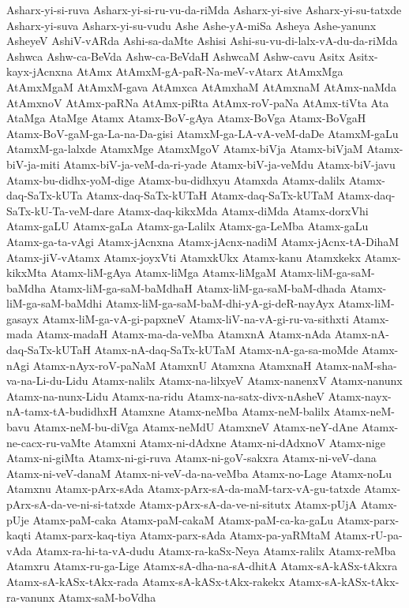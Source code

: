 {Asharx-yi-si-ruva
Asharx-yi-si-ru-vu-da-riMda
Asharx-yi-sive
Asharx-yi-su-tatxde
Asharx-yi-suva
Asharx-yi-su-vudu
Ashe
Ashe-yA-miSa
Asheya
Ashe-yanunx
AsheyeV
AshiV-vARda
Ashi-sa-daMte
Ashisi
Ashi-su-vu-di-lalx-vA-du-da-riMda
Ashwca
Ashw-ca-BeVda
Ashw-ca-BeVdaH
AshwcaM
Ashw-cavu
Asitx
Asitx-kayx-jAcnxna
AtAmx
AtAmxM-gA-paR-Na-meV-vAtarx
AtAmxMga
AtAmxMgaM
AtAmxM-gava
AtAmxca
AtAmxhaM
AtAmxnaM
AtAmx-naMda
AtAmxnoV
AtAmx-paRNa
AtAmx-piRta
AtAmx-roV-paNa
AtAmx-tiVta
Ata
AtaMga
AtaMge
Atamx
Atamx-BoV-gAya
Atamx-BoVga
Atamx-BoVgaH
Atamx-BoV-gaM-ga-La-na-Da-gisi
AtamxM-ga-LA-vA-veM-daDe
AtamxM-gaLu
AtamxM-ga-lalxde
AtamxMge
AtamxMgoV
Atamx-biVja
Atamx-biVjaM
Atamx-biV-ja-miti
Atamx-biV-ja-veM-da-ri-yade
Atamx-biV-ja-veMdu
Atamx-biV-javu
Atamx-bu-didhx-yoM-dige
Atamx-bu-didhxyu
Atamxda
Atamx-dalilx
Atamx-daq-SaTx-kUTa
Atamx-daq-SaTx-kUTaH
Atamx-daq-SaTx-kUTaM
Atamx-daq-SaTx-kU-Ta-veM-dare
Atamx-daq-kikxMda
Atamx-diMda
Atamx-dorxVhi
Atamx-gaLU
Atamx-gaLa
Atamx-ga-Lalilx
Atamx-ga-LeMba
Atamx-gaLu
Atamx-ga-ta-vAgi
Atamx-jAcnxna
Atamx-jAcnx-nadiM
Atamx-jAcnx-tA-DihaM
Atamx-jiV-vAtamx
Atamx-joyxVti
AtamxkUkx
Atamx-kanu
Atamxkekx
Atamx-kikxMta
Atamx-liM-gAya
Atamx-liMga
Atamx-liMgaM
Atamx-liM-ga-saM-baMdha
Atamx-liM-ga-saM-baMdhaH
Atamx-liM-ga-saM-baM-dhada
Atamx-liM-ga-saM-baMdhi
Atamx-liM-ga-saM-baM-dhi-yA-gi-deR-nayAyx
Atamx-liM-gasayx
Atamx-liM-ga-vA-gi-papxneV
Atamx-liV-na-vA-gi-ru-va-sithxti
Atamx-mada
Atamx-madaH
Atamx-ma-da-veMba
AtamxnA
Atamx-nAda
Atamx-nA-daq-SaTx-kUTaH
Atamx-nA-daq-SaTx-kUTaM
Atamx-nA-ga-sa-moMde
Atamx-nAgi
Atamx-nAyx-roV-paNaM
AtamxnU
Atamxna
AtamxnaH
Atamx-naM-sha-va-na-Li-du-Lidu
Atamx-nalilx
Atamx-na-lilxyeV
Atamx-nanenxV
Atamx-nanunx
Atamx-na-nunx-Lidu
Atamx-na-ridu
Atamx-na-satx-divx-nAsheV
Atamx-nayx-nA-tamx-tA-budidhxH
Atamxne
Atamx-neMba
Atamx-neM-balilx
Atamx-neM-bavu
Atamx-neM-bu-diVga
Atamx-neMdU
AtamxneV
Atamx-neY-dAne
Atamx-ne-cacx-ru-vaMte
Atamxni
Atamx-ni-dAdxne
Atamx-ni-dAdxnoV
Atamx-nige
Atamx-ni-giMta
Atamx-ni-gi-ruva
Atamx-ni-goV-sakxra
Atamx-ni-veV-dana
Atamx-ni-veV-danaM
Atamx-ni-veV-da-na-veMba
Atamx-no-Lage
Atamx-noLu
Atamxnu
Atamx-pArx-sAda
Atamx-pArx-sA-da-maM-tarx-vA-gu-tatxde
Atamx-pArx-sA-da-ve-ni-si-tatxde
Atamx-pArx-sA-da-ve-ni-situtx
Atamx-pUjA
Atamx-pUje
Atamx-paM-caka
Atamx-paM-cakaM
Atamx-paM-ca-ka-gaLu
Atamx-parx-kaqti
Atamx-parx-kaq-tiya
Atamx-parx-sAda
Atamx-pa-yaRMtaM
Atamx-rU-pa-vAda
Atamx-ra-hi-ta-vA-dudu
Atamx-ra-kaSx-Neya
Atamx-ralilx
Atamx-reMba
Atamxru
Atamx-ru-ga-Lige
Atamx-sA-dha-na-sA-dhitA
Atamx-sA-kASx-tAkxra
Atamx-sA-kASx-tAkx-rada
Atamx-sA-kASx-tAkx-rakekx
Atamx-sA-kASx-tAkx-ra-vanunx
Atamx-saM-boVdha
}
